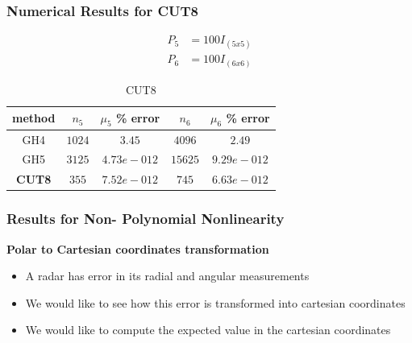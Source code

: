 \documentclass{beamer}
\begin{document}
\begin{frame}
\frametitle{Numerical Results for CUT8}
\begin{align*}
P_5&=100I_{(5x5)}\\
P_6&=100I_{(6x6)}
\end{align*}

\begin{table}
\caption{CUT8}
\normalsize
\begin{center}
\begin{tabular}{|c||c|c||c|c|}
\hline
method     & 		$n_5$ 	 	 	&				$\mu_5$ \% error 		& 		$n_6$     & 	$\mu_6$ \% error						\\
\hline
GH4  	 &  	 	$1024$ 			 	&	  		$	3.45$ 				 	    &   $4096$          &     $2.49$									 \\
\hline 
GH5  	 &  	 	$3125$ 			 	&	  		$4.73e-012$ 				&     $15625$        &     $9.29e-012$									 \\
\hline
{\bf CUT8 }			 &	  	$355$  				&  		$7.52e-012$ 				  &       $745$      & 		$6.63e-012$									\\
\hline
\end{tabular}
\end{center}
\end{table}
\end{frame}
\begin{frame}
\frametitle{Results for Non- Polynomial Nonlinearity}
{\bf Polar to Cartesian coordinates transformation}
\begin{itemize}[<+->]
\item A radar has error in its radial and angular measurements
\item We would like to see how this error is transformed into cartesian coordinates
\item We would like to compute the expected value in the cartesian coordinates
\end{itemize}
\end{frame}
\end{document}
